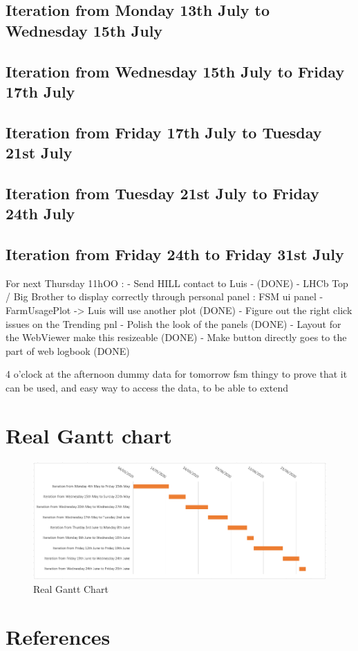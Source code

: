 \documentclass[a4paper, 12pt]{article}
\begin{document}
\begin{appendix}
    \subsection{Iteration from Monday 13th July to Wednesday 15th July}
    \subsection{Iteration from Wednesday 15th July to Friday 17th July}
    \subsection{Iteration from Friday 17th July to Tuesday 21st July}
    \subsection{Iteration from Tuesday 21st July to Friday 24th July}
    \subsection{Iteration from Friday 24th to Friday 31st July}

    
    For next Thursday 11hOO : 
    - Send HILL contact to Luis - (DONE)
    - LHCb Top / Big Brother to display correctly through personal panel : FSM ui panel
    - FarmUsagePlot -> Luis will use another plot (DONE)
    - Figure out the right click issues on the Trending pnl
    - Polish the look of the panels (DONE)
    - Layout for the WebViewer make this resizeable (DONE)
    - Make button directly goes to the part of web logbook (DONE)

    4 o'clock at the afternoon
    dummy data for tomorrow
    fsm thingy
    to prove that it can be used, and easy way to access the data, to be able to extend
    \newpage
    \section{Real Gantt chart}
    \begin{figure}[h]
        \centering
        \includegraphics[scale = 0.6]{images/gantt.png}
        \caption{Real Gantt Chart}
    \end{figure}
\end{appendix}

\newpage
\section{References}
\nocite{*}
\printbibliography[heading=subbibintoc,type=article,title={Bibliography}]
\printbibliography[heading=subbibintoc,type=misc,title={Webography}]
\end{document}
